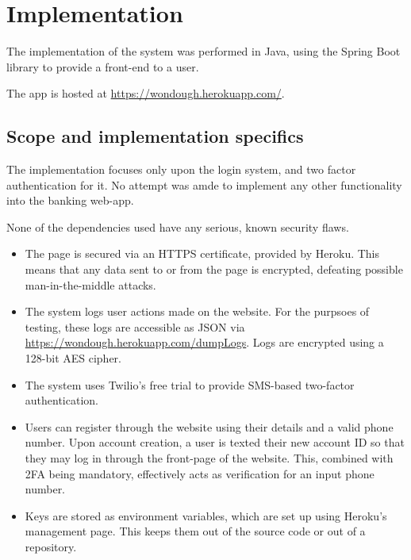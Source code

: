 \section{Implementation}

The implementation of the system was performed in Java, using the Spring Boot library to provide a front-end to a user. 

The app is hosted at \url{https://wondough.herokuapp.com/}.

\subsection{Scope and implementation specifics}

The implementation focuses only upon the login system, and two factor authentication for it. No attempt was amde to implement any other functionality into the banking web-app.

None of the dependencies used have any serious, known security flaws.

\begin{itemize}

    \item The page is secured via an HTTPS certificate, provided by Heroku. This means that any data sent to or from the page is encrypted, defeating possible man-in-the-middle attacks. 

    \item The system logs user actions made on the website. For the purpsoes of testing, these logs are accessible as JSON via \url{https://wondough.herokuapp.com/dumpLogs}. Logs are encrypted using a 128-bit AES cipher. 

    \item The system uses Twilio's free trial to provide SMS-based two-factor authentication. 

    \item Users can register through the website using their details and a valid phone number. Upon account creation, a user is texted their new account ID so that they may log in through the front-page of the website. This, combined with 2FA being mandatory, effectively acts as verification for an input phone number.

    \item Keys are stored as environment variables, which are set up using Heroku's management page. This keeps them out of the source code or out of a repository. 

\end{itemize}


